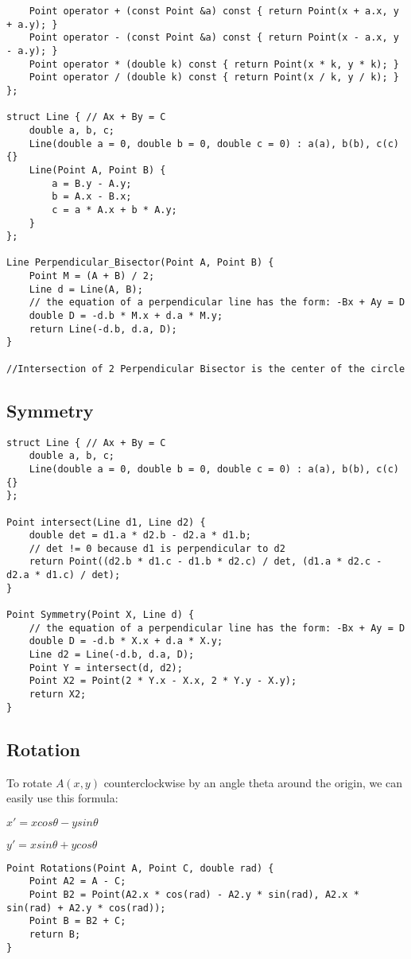 \documentclass[11pt,a4paper]{article}
\begin{document}
\begin{multicols*}{2}
\begin{lstlisting}
    Point operator + (const Point &a) const { return Point(x + a.x, y + a.y); }
    Point operator - (const Point &a) const { return Point(x - a.x, y - a.y); }
    Point operator * (double k) const { return Point(x * k, y * k); }
    Point operator / (double k) const { return Point(x / k, y / k); }
};

struct Line { // Ax + By = C
    double a, b, c;
    Line(double a = 0, double b = 0, double c = 0) : a(a), b(b), c(c) {}
    Line(Point A, Point B) {
        a = B.y - A.y;
        b = A.x - B.x;
        c = a * A.x + b * A.y;
    }
};

Line Perpendicular_Bisector(Point A, Point B) {
    Point M = (A + B) / 2;
    Line d = Line(A, B);
    // the equation of a perpendicular line has the form: -Bx + Ay = D
    double D = -d.b * M.x + d.a * M.y;
    return Line(-d.b, d.a, D);
}

//Intersection of 2 Perpendicular Bisector is the center of the circle
\end{lstlisting}

\subsection{Symmetry}
\begin{lstlisting}
struct Line { // Ax + By = C
    double a, b, c;
    Line(double a = 0, double b = 0, double c = 0) : a(a), b(b), c(c) {}
};

Point intersect(Line d1, Line d2) {
    double det = d1.a * d2.b - d2.a * d1.b;
    // det != 0 because d1 is perpendicular to d2
    return Point((d2.b * d1.c - d1.b * d2.c) / det, (d1.a * d2.c - d2.a * d1.c) / det);
}

Point Symmetry(Point X, Line d) {
    // the equation of a perpendicular line has the form: -Bx + Ay = D
    double D = -d.b * X.x + d.a * X.y;
    Line d2 = Line(-d.b, d.a, D);
    Point Y = intersect(d, d2);
    Point X2 = Point(2 * Y.x - X.x, 2 * Y.y - X.y);
    return X2;
}
\end{lstlisting}

\subsection{Rotation}
To rotate $A(x, y)$ counterclockwise by an angle theta around the origin, we can easily use this formula:

$x' = xcos\theta - ysin\theta$


$y' = xsin\theta + ycos\theta$
\begin{lstlisting}
Point Rotations(Point A, Point C, double rad) {
    Point A2 = A - C;
    Point B2 = Point(A2.x * cos(rad) - A2.y * sin(rad), A2.x * sin(rad) + A2.y * cos(rad));
    Point B = B2 + C;
    return B;
}
\end{lstlisting}


\end{multicols*}
\end{document}
